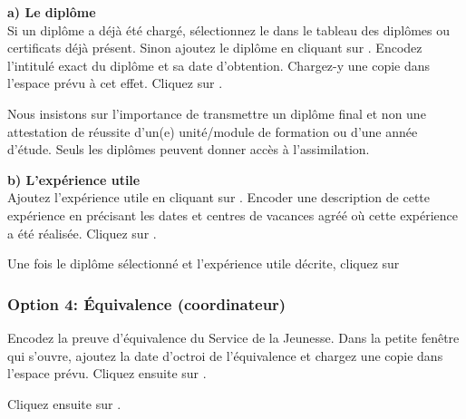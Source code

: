 \textbf{a) Le diplôme}
\\Si un diplôme a déjà été chargé, sélectionnez le dans le tableau des diplômes ou certificats déjà présent.
Sinon ajoutez le diplôme en cliquant sur . Encodez l'intitulé exact du diplôme et sa date d'obtention. Chargez-y une copie dans l'espace prévu à cet effet. Cliquez sur .
\begin{attention}
Nous insistons sur l’importance de transmettre un diplôme final et non une attestation de réussite d’un(e) unité/module de formation ou d’une année d’étude. Seuls les diplômes peuvent donner accès à l’assimilation.
\end{attention}


\textbf{b) L'expérience utile}
\\Ajoutez l'expérience utile en cliquant sur . Encoder une description de cette expérience en précisant les dates et centres de vacances agréé où cette expérience a été réalisée. Cliquez sur . 

\vspace{0.4cm}
Une fois le diplôme sélectionné et l'expérience utile décrite, cliquez sur 




\subsubsection{Option 4: Équivalence (coordinateur)}
Encodez la preuve d'équivalence du Service de la Jeunesse. Dans la petite fenêtre qui s'ouvre, ajoutez la date d'octroi de l'équivalence et chargez une copie dans l'espace prévu. Cliquez ensuite sur . 

Cliquez ensuite sur . 




